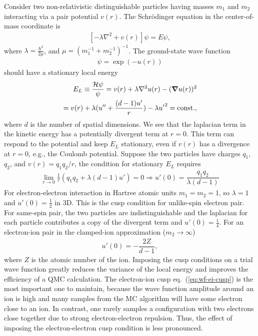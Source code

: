 Consider two non-relativistic distinguishable particles having masses $m_1$ and $m_2$ interacting via a pair potential $v(r)$. The Schr\"odinger equation in the center-of-mass coordinate is
\begin{align}
\left[-\lambda\nabla^2 + v(r)\right] \psi = E\psi,
\end{align}
where $\lambda=\frac{\hbar^2}{2\mu}$, and $\mu=(m_1^{-1}+m_2^{-1})^{-1}$. The ground-state wave function
\begin{align}
\psi = \exp(-u(r))
\end{align}
should have a stationary local energy
\begin{align} \label{eq:wf-cusp}
E_L \equiv \dfrac{\mathcal{H}\psi}{\psi} = v(r) + \lambda\nabla^2u(r) - (\boldsymbol{\nabla}u(r))^2 \nonumber \\
= v(r) + \lambda (u''+\frac{(d-1)u'}{r}) - \lambda {u'}^2 = \text{const.},
\end{align}
where $d$ is the number of spatial dimensions.
We see that the laplacian term in the kinetic energy has a potentially divergent term at $r=0$.
This term can respond to the potential and keep $E_L$ stationary, even if $v(r)$ has a divergence at $r=0$, e.g., the Coulomb potential. Suppose the two particles have charges $q_1$, $q_2$, and $v(r)=q_1q_2/r$, the condition for stationary $E_L$ requires
\begin{align}
\lim\limits_{r\rightarrow 0}\frac{1}{r} (q_1q_2+ \lambda (d-1) u')=0 \Rightarrow u'(0) = \dfrac{q_1q_2}{\lambda (d-1)}
\end{align}
For electron-electron interaction in Hartree atomic units $m_1=m_2=1$, so $\lambda=1$ and $u'(0)=\frac{1}{2}$ in 3D. This is the cusp condition for unlike-spin electron pair. For same-spin pair, the two particles are indistinguishable and the laplacian for each particle contributes a copy of the divergent term and $u'(0)=\frac{1}{4}$. For an electron-ion pair in the clamped-ion approximation ($m_2\rightarrow\infty$)
\begin{align} \label{eq:wf-ei-cusp}
u'(0) = -\dfrac{2Z}{d-1},
\end{align}
where $Z$ is the atomic number of the ion. Imposing the cusp conditions on a trial wave function greatly reduces the variance of the local energy and improves the efficiency of a QMC calculation. The electron-ion cusp eq.~(\ref{eq:wf-ei-cusp}) is the most important one to maintain, because the wave function amplitude around an ion is high and many samples from the MC algorithm will have some electron close to an ion. In contrast, one rarely samples a configuration with two electrons close together due to strong electron-electron repulsion. Thus, the effect of imposing the electron-electron cusp condition is less pronounced.

